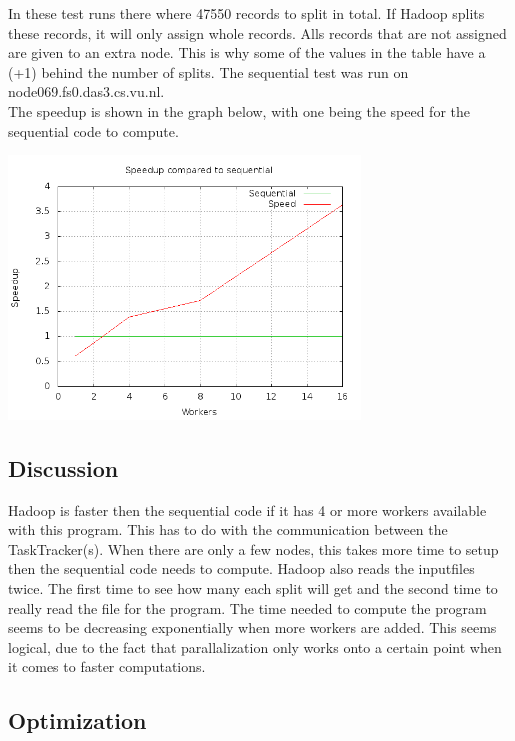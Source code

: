 \documentclass[a4paper]{article}
\begin{document}
    In these test runs there where 47550 records to split in total.
    If Hadoop splits these records, it will only assign whole records.
    Alls records that are not assigned are given to an extra node. This is why some of the values in the table
    have a (+1) behind the number of splits.
    The sequential test was run on node069.fs0.das3.cs.vu.nl.\\
    The speedup is shown in the graph below, with one being the
    speed for the sequential code to compute.
    \begin{center}
      \includegraphics[width=0.7\textwidth]{speedup.png}
    \end{center}
  \subsection{Discussion}
    Hadoop is faster then the sequential code if it has 4 or more workers
    available with this program. This has to do with the communication
    between the TaskTracker(s). When there are only a few nodes,
    this takes more time to setup then the sequential code needs to compute.
    Hadoop also reads the inputfiles twice. The first time to see how many
    each split will get and the second time to really read the file for the program.
    The time needed to compute the program seems to be decreasing exponentially
    when more workers are added. This seems logical, due to the fact that
    parallalization only works onto a certain point when it comes to faster
    computations.
  \subsection{Optimization}
  
\end{document}
